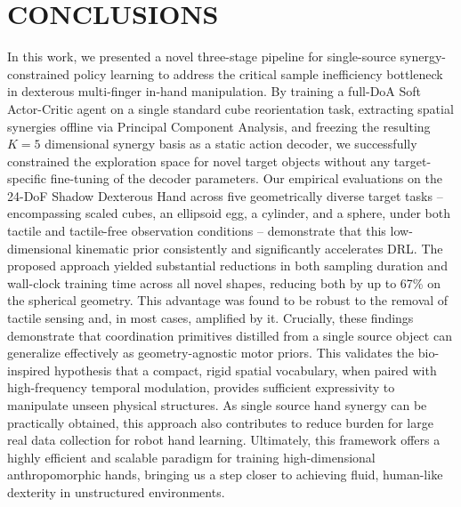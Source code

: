 \documentclass[letterpaper, 10 pt, conference]{ieeeconf}  %
\begin{document}



\section{CONCLUSIONS}
In this work, we presented a novel three-stage pipeline for single-source synergy-constrained policy learning to address the critical sample inefficiency bottleneck in dexterous multi-finger in-hand manipulation. By training a full-DoA Soft Actor-Critic agent on a single standard cube reorientation task, extracting spatial synergies offline via Principal Component Analysis, and freezing the resulting $K=5$ dimensional synergy basis as a static action decoder, we successfully constrained the exploration space for novel target objects without any target-specific fine-tuning of the decoder parameters.  Our empirical evaluations on the 24-DoF Shadow Dexterous Hand across five geometrically diverse target tasks -- encompassing scaled cubes, an ellipsoid egg, a cylinder, and a sphere, under both tactile and tactile-free observation conditions -- demonstrate that this low-dimensional kinematic prior consistently and significantly accelerates DRL. The proposed approach yielded substantial reductions in both sampling duration and wall-clock training time across all novel shapes, reducing both by up to 67\% on the spherical geometry. This advantage was found to be robust to the removal of tactile sensing and, in most cases, amplified by it.   Crucially, these findings demonstrate that coordination primitives distilled from a single source object can generalize effectively as geometry-agnostic motor priors. This validates the bio-inspired hypothesis that a compact, rigid spatial vocabulary, when paired with high-frequency temporal modulation, provides sufficient expressivity to manipulate unseen physical structures. As single source hand synergy can be practically obtained, this approach also contributes to reduce burden for large real data collection for robot hand learning.
Ultimately, this framework offers a highly efficient and scalable paradigm for training high-dimensional anthropomorphic hands, bringing us a step closer to achieving fluid, human-like dexterity in unstructured environments. 
\end{document}
